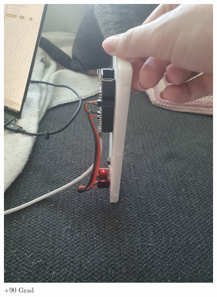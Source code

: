 \begin{figure}[H]
\begin{minipage}[b]{0.29\textwidth}
    \includegraphics[width=\textwidth, angle=-90]{assets/ET/Gyroskop/gyro-90-deg.jpg}
    \caption{+90 Grad}
    \label{fig:gyro--90}
  \end{minipage}
    \hfill
  \begin{minipage}[b]{0.29\textwidth}
    \centering

\end{minipage}
\end{figure}
